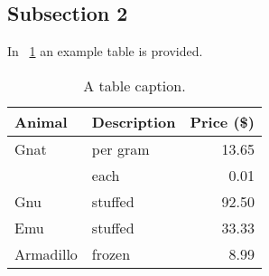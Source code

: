 \subsection{Subsection 2}
\label{sec:Subsection2}

In \tablename~\ref{tbl:aTable} an example table is provided. 

\begin{table}[htb]
\centering
\caption{A table caption.}
\label{tbl:aTable}
\vspace{.5em}
\begin{tabular}{|llr|}
	\hline
	\textbf{Animal} & \textbf{Description} & \textbf{Price (\$)} \\ \hline
	Gnat            & per gram             &               13.65 \\ \hline
	                & each                 &                0.01 \\ \hline
	Gnu             & stuffed              &               92.50 \\ \hline
	Emu             & stuffed              &               33.33 \\ \hline
	Armadillo       & frozen               &                8.99 \\ \hline
\end{tabular}
\end{table}